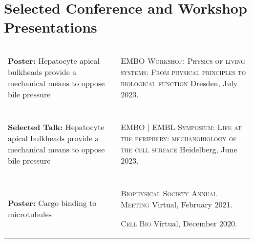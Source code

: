 \documentclass[letterpaper,10pt]{article} %
\makeatletter
\newcommand\cellwidth{\TX@col@width}
\makeatother
\begin{document}
\bigskip
\section*{Selected Conference and Workshop Presentations}
\bigskip

\begin{tabularx}{\textwidth}{p{} | X}


\begin{minipage}{.4\textwidth}
\textbf{Poster:} Hepatocyte apical bulkheads provide a mechanical means to oppose bile pressure
\end{minipage}
&
\begin{minipage}{\cellwidth}
\begin{description}[itemsep=.25ex,labelsep=0em]
\item \textsc{EMBO Workshop: Physics of living systems: From physical principles to biological function} Dresden, July 2023.
\end{description}
\end{minipage} \\

\multicolumn{2}{c}{} \\


\begin{minipage}{.4\textwidth}
\textbf{Selected Talk:} Hepatocyte apical bulkheads provide a mechanical means to oppose bile pressure
\end{minipage}
&
\begin{minipage}{\cellwidth}
\begin{description}[itemsep=.25ex,labelsep=0em]
\item \textsc{EMBO | EMBL Symposium: Life at the periphery: mechanobiology of the cell surface} Heidelberg, June 2023.
\end{description}
\end{minipage} \\

\multicolumn{2}{c}{} \\

\begin{minipage}{.4\textwidth}
\textbf{Poster:} Cargo binding to microtubules
\end{minipage}
&
\begin{minipage}{\cellwidth}
\begin{description}[itemsep=.25ex,labelsep=0em]
\item \textsc{Biophysical Society Annual Meeting} Virtual, February 2021.
\item \textsc{Cell Bio} Virtual, December 2020.
\end{description}
\end{minipage} \\


\end{tabularx}
\end{document}
